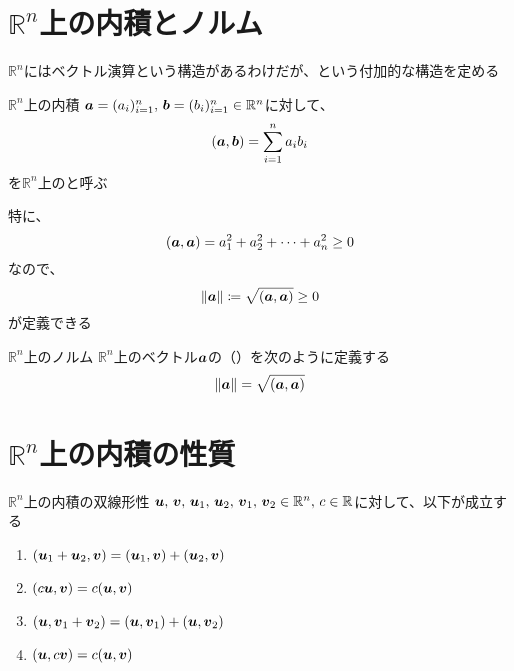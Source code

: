 \documentclass[../../../topic_linear-algebra]{subfiles}
\begin{document}
\sectionline
\section{$\mathbb{R}^n$上の内積とノルム}

$\mathbb{R}^n$にはベクトル演算という構造があるわけだが、という付加的な構造を定める

\begin{definition}{$\mathbb{R}^n$上の内積}
  $\vb*{a} = (a_i)_{i=1}^n,\, \vb*{b} = (b_i)_{i=1}^n \in \mathbb{R}^n$に対して、
  \begin{equation*}
    (\vb*{a}, \vb*{b}) = \sum_{i=1}^n a_i b_i
  \end{equation*}
  を$\mathbb{R}^n$上のと呼ぶ
\end{definition}

\sectionline

特に、
\begin{equation*}
  (\vb*{a}, \vb*{a}) = a_1^2 + a_2^2 + \cdots + a_n^2 \geq 0
\end{equation*}
なので、
\begin{equation*}
  \|\vb*{a}\| \coloneq \sqrt{(\vb*{a}, \vb*{a})} \geq 0
\end{equation*}
が定義できる

\begin{definition}{$\mathbb{R}^n$上のノルム}
  $\mathbb{R}^n$上のベクトル$\vb*{a}$の（）を次のように定義する
  \begin{align*}
    \|\vb*{a}\| = \sqrt{(\vb*{a}, \vb*{a})}
  \end{align*}
\end{definition}

\sectionline
\section{$\mathbb{R}^n$上の内積の性質}

\begin{theorem}{$\mathbb{R}^n$上の内積の双線形性}
  $\vb*{u},\,\vb*{v},\,\vb*{u}_1,\,\vb*{u}_2,\,\vb*{v}_1,\,\vb*{v}_2 \in \mathbb{R}^n,\,c\in \mathbb{R}$に対して、以下が成立する
  \begin{enumerate}[label=\romanlabel]
    \item $(\vb*{u}_1 + \vb*{u}_2, \vb*{v}) = (\vb*{u}_1, \vb*{v}) + (\vb*{u}_2, \vb*{v})$
    \item $(c\vb*{u}, \vb*{v}) = c(\vb*{u}, \vb*{v})$
    \item $(\vb*{u}, \vb*{v}_1 + \vb*{v}_2) = (\vb*{u}, \vb*{v}_1) + (\vb*{u}, \vb*{v}_2)$
    \item $(\vb*{u}, c\vb*{v}) = c(\vb*{u}, \vb*{v})$
  \end{enumerate}
\end{theorem}
\end{document}
